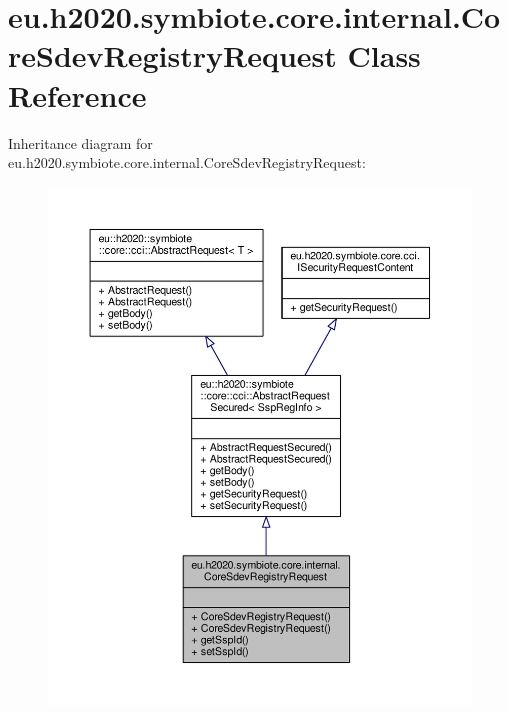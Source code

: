\hypertarget{classeu_1_1h2020_1_1symbiote_1_1core_1_1internal_1_1CoreSdevRegistryRequest}{}\section{eu.\+h2020.\+symbiote.\+core.\+internal.\+Core\+Sdev\+Registry\+Request Class Reference}
\label{classeu_1_1h2020_1_1symbiote_1_1core_1_1internal_1_1CoreSdevRegistryRequest}


Inheritance diagram for eu.\+h2020.\+symbiote.\+core.\+internal.\+Core\+Sdev\+Registry\+Request\+:
\nopagebreak
\begin{figure}[H]
\begin{center}
\leavevmode
\includegraphics[width=350pt]{classeu_1_1h2020_1_1symbiote_1_1core_1_1internal_1_1CoreSdevRegistryRequest__inherit__graph}
\end{center}
\end{figure}



